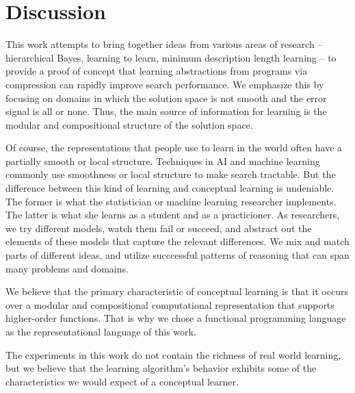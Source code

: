 \documentclass{article}
\begin{document}


\section{Discussion}
This work attempts to bring together ideas from various areas of
research -- hierarchical Bayes, learning to learn, minimum description
length learning -- to provide a proof of concept that learning
abstractions from programs via compression can rapidly improve search
performance. We emphasize this by focusing on domains in which the
solution space is not smooth and the error signal is all or
none. Thus, the main source of information for learning is the modular
and compositional structure of the solution space.

Of course, the representations that people use to learn in the world
often have a partially smooth or local structure. Techniques in AI and
machine learning commonly use smoothness or local structure to make
search tractable. But the difference between this kind of learning and
conceptual learning is undeniable. The former is what the statistician
or machine learning researcher implements. The latter is what she
learns as a student and as a practicioner. As researchers, we try
different models, watch them fail or succeed, and abstract out the
elements of these models that capture the relevant differences. We mix
and match parts of different ideas, and utilize succcessful patterns
of reasoning that can span many problems and domains. 

We believe that the primary characteristic of conceptual learning is
that it occurs over a modular and compositional computational
representation that supports higher-order functions. That is why we
chose a functional programming language as the representational
language of this work.

The experiments in this work do not contain the richness of real world
learning, but we believe that the learning algorithm's behavior
exhibits some of the characteristics we would expect of a conceptual
learner. 
\end{document}
